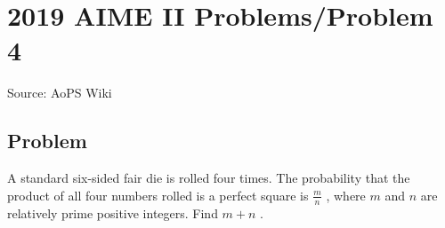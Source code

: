 \documentclass[12pt]{article}
\begin{document}
\section*{{2019 AIME II Problems/Problem 4}}
Source: AoPS Wiki

\subsection*{Problem}
A standard six-sided fair die is rolled four times. The probability that the product of all four numbers rolled is a perfect square is $\tfrac{m}{n}$ , where $m$ and $n$ are relatively prime positive integers. Find $m+n$ .
\end{document}
